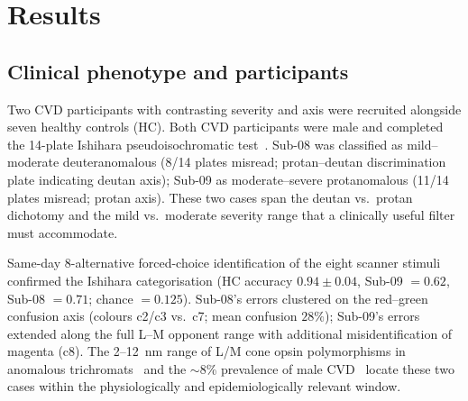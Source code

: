 %
%
%

\section{Results}
\label{sec:results}

\subsection{Clinical phenotype and participants}
\label{sec:results:behavior}

Two CVD participants with contrasting severity and axis were recruited
alongside seven healthy controls (HC). Both CVD participants were
male and completed the 14-plate Ishihara pseudoisochromatic
test~\citep{ishihara1917}. Sub-08 was classified as mild--moderate
deuteranomalous (8/14 plates misread; protan--deutan discrimination
plate indicating deutan axis); Sub-09 as moderate--severe
protanomalous (11/14 plates misread; protan axis). These two cases
span the deutan vs.\ protan dichotomy and the mild vs.\ moderate
severity range that a clinically useful filter must accommodate.

Same-day 8-alternative forced-choice identification of the eight
scanner stimuli confirmed the Ishihara categorisation (HC accuracy
$0.94 \pm 0.04$, Sub-09 $= 0.62$, Sub-08 $= 0.71$; chance
$= 0.125$). Sub-08's errors clustered on the red--green confusion
axis (colours c2/c3 vs.\ c7; mean confusion $28\%$); Sub-09's errors
extended along the full L--M opponent range with additional
misidentification of magenta (c8). The 2--12~nm range of L/M cone
opsin polymorphisms in anomalous
trichromats~\citep{neitz2011, deeb2005} and the $\sim$8\% prevalence
of male CVD~\citep{bosten2019} locate these two cases within the
physiologically and epidemiologically relevant window.

